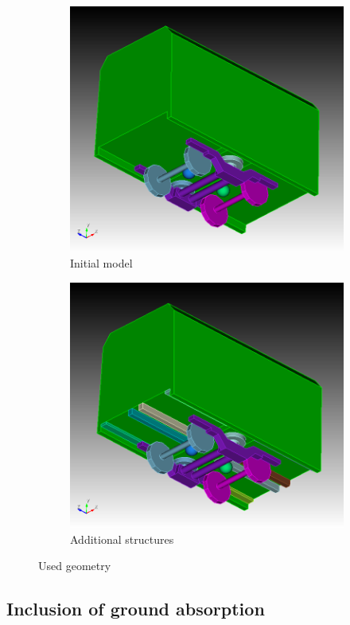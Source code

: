\begin{figure}[H]
\begin{subfigure}[b]{0.49\textwidth}
		\includegraphics[width = 0.8\linewidth]{fig/chap4/geometry/initial_model_2.png}
		\caption{Initial model}
	\end{subfigure}
	\begin{subfigure}[b]{0.49\textwidth}
		\centering
		\includegraphics[width = 0.8\linewidth]{fig/chap4/geometry/additional_structures.png}
		\caption{Additional structures}
	\end{subfigure}

	\caption{Used geometry}
\end{figure}

\subsection{Inclusion of ground absorption}

